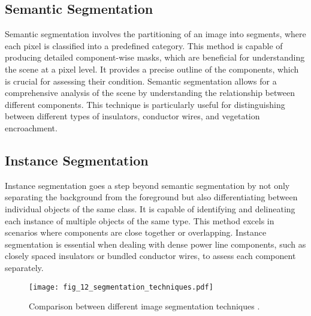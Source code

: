 \subsection{Semantic Segmentation}
Semantic segmentation involves the partitioning of an image into segments, where each pixel is classified into a predefined category. This method is capable of producing detailed component-wise masks, which are beneficial for understanding the scene at a pixel level. It provides a precise outline of the components, which is crucial for assessing their condition. Semantic segmentation allows for a comprehensive analysis of the scene by understanding the relationship between different components. This technique is particularly useful for distinguishing between different types of insulators, conductor wires, and vegetation encroachment.

\subsection{Instance Segmentation}
Instance segmentation goes a step beyond semantic segmentation by not only separating the background from the foreground but also differentiating between individual objects of the same class. It is capable of identifying and delineating each instance of multiple objects of the same type. This method excels in scenarios where components are close together or overlapping. Instance segmentation is essential when dealing with dense power line components, such as closely spaced insulators or bundled conductor wires, to assess each component separately.

\begin{figure}[htb]
    \centering
    \texttt{[image: fig\_12\_segmentation\_techniques.pdf]}
    \caption{Comparison between different image segmentation techniques \cite{electronics12153210, bob_semantic}.}
    \label{fig:cv_tasks}
\end{figure}
